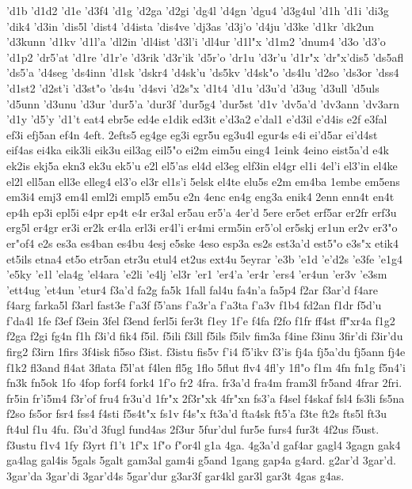 {'d1b
'd1d2
'd1e
'd3f4
'd1g
'd2ga
'd2gi
'dg4l
'd4gn
'dgu4
'd3g4ul
'd1h
'd1i
'di3g
'dik4
'd3in
'dis5l
'dist4
'd4ista
'dis4ve
'dj3as
'd3j'o
'd4ju
'd3ke
'd1kr
'dk2un
'd3kunn
'd1kv
'd1l'a
'dl2in
'dl4ist
'd3l'i
'dl4ur
'd1l"x
'd1m2
'dnum4
'd3o
'd3'o
'd1p2
'dr5'at
'd1re
'd1r'e
'd3rik
'd3r'ik
'd5r'o
'dr1u
'd3r'u
'd1r"x
'dr"x'dis5
'ds5afl
'ds5'a
'd4seg
'ds4inn
'd1sk
'dskr4
'd4sk'u
'ds5kv
'd4sk"o
'ds4lu
'd2so
'ds3or
'dss4
'd1st2
'd2st'i
'd3st"o
'ds4u
'd4svi
'd2s"x
'd1t4
'd1u
'd3u'd
'd3ug
'd3ull
'd5uls
'd5unn
'd3unu
'd3ur
'dur5'a
'dur3f
'dur5g4
'dur5st
'd1v
'dv5a'd
'dv3ann
'dv3arn
'd1y
'd5'y
'd1't
eat4
ebr5e
ed4e
e1dik
ed3it
e'd3a2
e'dal1
e'd3il
e'd4is
e2f
e3fal
ef3i
efj5an
ef4n
4eft.
2efts5
eg4ge
eg3i
egr5u
eg3u4l
egur4s
e4i
ei'd5ar
ei'd4st
eif4as
ei4ka
eik3li
eik3u
eil3ag
eil5"o
ei2m
eim5u
eing4
1eink
4eino
eist5a'd
e4k
ek2is
ekj5a
ekn3
ek3u
ek5'u
e2l
el5'as
el4d
el3eg
elf3in
el4gr
el1i
4el'i
el3'in
el4ke
el2l
ell5an
ell3e
elleg4
el3'o
el3r
el1s'i
5elsk
el4te
elu5s
e2m
em4ba
1embe
em5ens
em3i4
emj3
em4l
eml2i
empl5
em5u
e2n
4enc
en4g
eng3a
enik4
2enn
enn4t
en4t
ep4h
ep3i
epl5i
e4pr
ep4t
e4r
er3al
er5au
er5'a
4er'd
5ere
er5et
erf5ar
er2fr
erf3u
erg5l
er4gr
er3i
er2k
er4la
erl3i
er4l'i
er4mi
erm5in
er5'ol
er5skj
er1un
er2v
er3"o
er"of4
e2s
es3a
es4ban
es4bu
4esj
e5ske
4eso
esp3a
es2s
est3a'd
est5"o
e3s"x
etik4
et5ils
etna4
et5o
etr5an
etr3u
etul4
et2us
ext4u
5eyrar
'e3b
'e1d
'e'd2s
'e3fe
'e1g4
'e5ky
'e1l
'ela4g
'el4ara
'e2li
'e4lj
'el3r
'er1
'er4'a
'er4r
'ers4
'er4un
'er3v
'e3sm
'ett4ug
'et4un
'etur4
f3a'd
fa2g
fa5k
1fall
fal4u
fa4n'a
fa5p4
f2ar
f3ar'd
f4are
f4arg
farka5l
f3arl
fast3e
f'a3f
f5'ans
f'a3r'a
f'a3ta
f'a3v
f1b4
fd2an
f1dr
f5d'u
f'da4l
1fe
f3ef
f3ein
3fel
f3end
ferl5i
fer3t
f1ey
1f'e
f4fa
f2fo
f1fr
ff4st
ff"xr4a
f1g2
f2ga
f2gi
fg4n
f1h
f3i'd
fik4
f5il.
f5ili
f3ill
f5ils
f5ilv
fim3a
f4ine
f3inu
3fir'di
f3ir'du
firg2
f3irn
1firs
3f4isk
fi5so
f3ist.
f3istu
fis5v
f'i4
f5'ikv
f3'is
fj4a
fj5a'du
fj5ann
fj4e
f1k2
fl3and
fl4at
3flata
f5l'at
f4len
fl5g
1flo
5flut
flv4
4fl'y
1fl"o
f1m
4fn
fn1g
f5n4'i
fn3k
fn5ok
1fo
4fop
forf4
fork4
1f'o
fr2
4fra.
fr3a'd
fra4m
fram3l
fr5and
4frar
2fri.
fr5in
fr'i5m4
f3r'of
fru4
fr3u'd
1fr"x
2f3r"xk
4fr"xn
fs3'a
f4sel
f4skaf
fsl4
fs3li
fs5na
f2so
fs5or
fsr4
fss4
f4sti
f5s4t"x
fs1v
f4s"x
ft3a'd
fta4sk
ft5'a
f3te
ft2s
fts5l
ft3u
ft4ul
f1u
4fu.
f3u'd
3fugl
fund4as
2f3ur
5fur'dul
fur5e
furs4
fur3t
4f2us
f5ust.
f3ustu
f1v4
1fy
f3yrt
f1't
1f"x
1f"o
f"or4l
g1a
4ga.
4g3a'd
gaf4ar
gagl4
3gagn
gak4
ga4lag
gal4is
5gals
5galt
gam3al
gam4i
g5and
1gang
gap4a
g4ard.
g2ar'd
3gar'd.
3gar'da
3gar'di
3gar'd4s
5gar'dur
g3ar3f
gar4kl
gar3l
gar3t
4gas
g4as.
}

